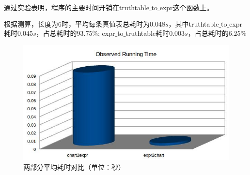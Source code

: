 	通过实验表明，程序的主要时间开销在truthtable$\_$to$\_$expr这个函数上。
	
	根据测算，长度为$6$时，平均每条真值表总耗时为$0.048s$，其中truthtable$\_$to$\_$expr耗时$0.045s$，占总耗时的$93.75\%$;
expr$\_$to$\_$truthtable耗时$0.003s$，占总耗时的$6.25\%$
	\begin{figure}[h]
		\centering
			\includegraphics[scale=0.7]{images/result.jpg}
			\caption{两部分平均耗时对比（单位：秒）}
	\end{figure}